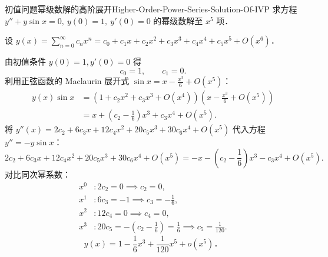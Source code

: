 \begin{problem}{初值问题幂级数解的高阶展开}{Higher-Order-Power-Series-Solution-Of-IVP}
    求方程 $y'' + y\sin x = 0, \ y(0) = 1, \ y'(0) = 0$ 的幂级数解至 $x^5$ 项．
\end{problem}

\begin{solution}
    设 $y(x) = \sum_{n=0}^\infty c_n x^n = c_0 + c_1 x + c_2 x^2 + c_3 x^3 + c_4 x^4 + c_5 x^5 + O(x^6)$．

    由初值条件 $y(0) = 1, y'(0) = 0$ 得
    \begin{equation}
        c_0 = 1, \qquad c_1 = 0.
    \end{equation}
    利用正弦函数的 Maclaurin 展开式 $\sin x = x - \frac{x^3}{6} + O(x^5)$：
    \begin{equation}
        \begin{aligned}
            y(x)\sin x & = \left( 1 + c_2 x^2 + c_3 x^3 + O(x^4) \right)\left( x - \frac{x^3}{6} + O(x^5) \right) \\
                       & = x + \left( c_2 - \frac{1}{6} \right)x^3 + c_3 x^4 + O(x^5).
        \end{aligned}
    \end{equation}
    将 $y''(x) = 2c_2 + 6c_3 x + 12c_4 x^2 + 20c_5 x^3 + 30c_6 x^4 + O(x^5)$ 代入方程 $y'' = -y\sin x$：
    \begin{equation}
        2c_2 + 6c_3 x + 12c_4 x^2 + 20c_5 x^3 + 30c_6 x^4 + O(x^5) = -x - \left( c_2 - \frac{1}{6} \right)x^3 - c_3 x^4 + O(x^5).
    \end{equation}
    对比同次幂系数：
    \begin{equation}
        \begin{aligned}
            x^0 & : 2c_2 = 0 \implies c_2 = 0,                                                            \\
            x^1 & : 6c_3 = -1 \implies c_3 = -\frac{1}{6},                                                \\
            x^2 & : 12c_4 = 0 \implies c_4 = 0,                                                           \\
            x^3 & : 20c_5 = -\left( c_2 - \frac{1}{6} \right) = \frac{1}{6} \implies c_5 = \frac{1}{120}.
        \end{aligned}
    \end{equation}
    \begin{equation}
        \boxed{y(x) = 1 - \frac{1}{6}x^3 + \frac{1}{120}x^5 + o(x^5)．}
    \end{equation}
\end{solution}

